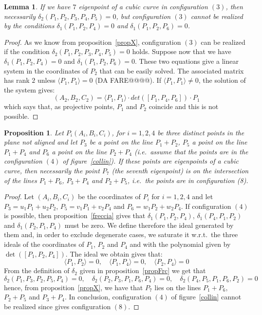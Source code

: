\documentclass{amsart}
\theoremstyle{plain}
\newtheorem{prop}[theorem]{Proposition}
\newtheorem{lemma}[theorem]{Lemma}
\theoremstyle{definition}
\newcommand{\scl}[2]{\langle #1, #2 \rangle}
\begin{document}
\begin{lemma} If we have $7$ eigenpoint of a cubic curve in configuration
  $(3)$, then necessarily $\delta_2(P_1, P_2, P_3, P_4, P_5)=0$, but
  configuration $(3)$ cannot be realized by the conditions
  $\delta_1(P_1, P_2, P_4) = 0$ and
  $\delta_1(P_1, P_2, P_6)=0$.
\end{lemma}
\begin{proof}
As we know from proposition~\ref{propX}, configuration $(3)$ can be realized
if the condition $\delta_2(P_1, P_2, P_3, P_4, P_5) = 0$ holds.
Suppose now that we have
$\delta_1(P_1, P_2, P_4) = 0$ and  $\delta_1(P_1, P_2, P_6)=0$. These
two equations give a linear system in the coordinates of $P_2$ that can
be easily solved. The associated matrix has rank $2$ unless
$\scl{P_1}{P_1}=0$ (DA FARE@@@@). If $\scl{P_1}{P_1} \not = 0$,
the solution of the system gives:
\[
(A_2, B_2, C_2) = \scl{P_1}{P_1} \cdot det([P_1, P_4, P_6])\cdot P_1
\]
which says that, as projective points, $P_1$ and $P_2$ coincide and this is
not possible. 
\end{proof}

\begin{prop}
Let $P_i(A_i, B_i, C_i)$, for $i=1, 2, 4$
be three distinct points in the plane not aligned and let
$P_3$ be a point on the line $P_1+P_2$, $P_5$ a point on the line
$P_1+P_4$ and $P_6$ a point on the line $P_2+P_4$ (i.e.\ assume that
the points are in the configuration $(4)$ of figure~\ref{collin}).
If these points are eigenpoints of a cubic curve, then
necessarily the point $P_7$ (the seventh eigenpoint) is on the intersection
of the lines $P_1+P_6$, $P_3+P_4$ and $P_2+P_5$, i.e.\ the points are in
configuration (8).
\label{prp4}
\end{prop}
\begin{proof}
  Let $(A_i, B_i, C_i)$ be the coordinates of $P_i$ for $i=1, 2, 4$ and let
  $P_3 = u_1P_1+u_2P_2$, $P_5 = v_1P_1+v_2P_4$ and $P_6 = w_1P_2+w_2P_4$.
  If configuration $(4)$ is possible, then proposition~\ref{freccia} gives that
  $\delta_1(P_1, P_2, P_4)$,  $\delta_1(P_4, P_1, P_2)$ and
  $\delta_1(P_2, P_1, P_4)$ must be zero. We define therefore the ideal
  generated by them and, in order to exclude degenerate cases,
  we saturate it w.r.t.\ the three ideals of the
  coordinates of $P_1$, $P_2$ and $P_4$ and with the polynomial
  given by $\det([P_1, P_2, P_4])$. The ideal we obtain gives that:
  \[
  \scl{P_1}{P_2}=0, \quad \scl{P_1}{P_4}=0, \quad
  \scl{P_2}{P_4}=0
  \]
    {From} the definition of $\delta_2$ given in proposition~\ref{propFrc}
    we get that
\[
\delta_2(P_1, P_3, P_2, P_5, P_4) = 0, \quad
\delta_2(P_2, P_3, P_1, P_6, P_4) = 0, \quad
\delta_2(P_4, P_5, P_1, P_6, P_2) = 0
\]
hence, from proposition~\ref{propX}, we have that $P_7$ lies on the lines
$P_1+P_6$, $P_2+P_5$ and $P_3+P_4$. In conclusion, configuration $(4)$ of
figure~\ref{collin} cannot be realized since gives configuration $(8)$.
\end{proof}
\end{document}
